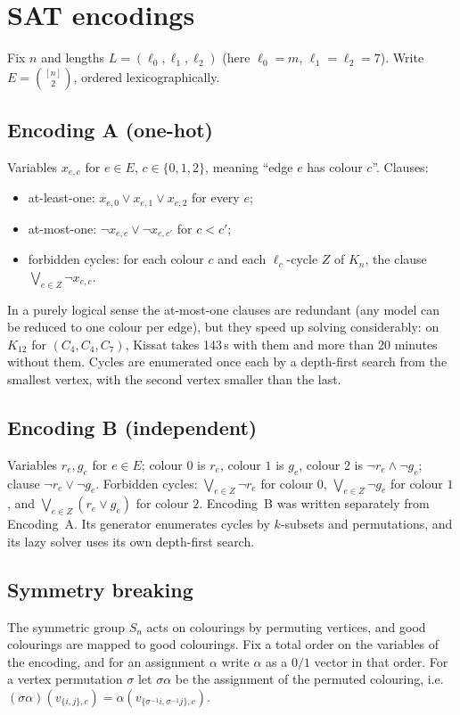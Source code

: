 \documentclass[11pt]{amsart}
\theoremstyle{definition}
\theoremstyle{remark}
\begin{document}
\section{SAT encodings}\label{sec:sat}

Fix $n$ and lengths $L=(\ell_0,\ell_1,\ell_2)$ (here $\ell_0=m$, $\ell_1=\ell_2=7$). Write $E=\binom{[n]}{2}$, ordered
lexicographically.

\subsection{Encoding A (one-hot)}
Variables $x_{e,c}$ for $e\in E$, $c\in\{0,1,2\}$, meaning ``edge $e$ has colour $c$''. Clauses:
\begin{itemize}
\item at-least-one: $x_{e,0}\vee x_{e,1}\vee x_{e,2}$ for every $e$;
\item at-most-one: $\neg x_{e,c}\vee\neg x_{e,c'}$ for $c<c'$;
\item forbidden cycles: for each colour $c$ and each $\ell_c$-cycle $Z$ of $K_n$, the clause $\bigvee_{e\in Z}\neg x_{e,c}$.
\end{itemize}
In a purely logical sense the at-most-one clauses are redundant (any model can be reduced to one colour per edge), but they speed up
solving considerably: on $K_{12}$ for $(C_4,C_4,C_7)$, Kissat takes 143\,s with them and more than 20 minutes without them. Cycles are
enumerated once each by a depth-first search from the smallest vertex, with the second vertex smaller than the last.

\subsection{Encoding B (independent)}
Variables $r_e, g_e$ for $e\in E$; colour $0$ is $r_e$, colour $1$ is $g_e$, colour $2$ is $\neg r_e\wedge\neg g_e$; clause
$\neg r_e\vee\neg g_e$. Forbidden cycles: $\bigvee_{e\in Z}\neg r_e$ for colour $0$, $\bigvee_{e\in Z}\neg g_e$ for colour $1$, and
$\bigvee_{e\in Z}(r_e\vee g_e)$ for colour $2$. Encoding~B was written separately from Encoding~A. Its generator enumerates cycles by
$k$-subsets and permutations, and its lazy solver uses its own depth-first search.

\subsection{Symmetry breaking}\label{sec:sb}
The symmetric group $S_n$ acts on colourings by permuting vertices, and good colourings are mapped to good colourings. Fix a total
order on the variables of the encoding, and for an assignment $\alpha$ write $\alpha$ as a $0/1$ vector in that order. For a vertex
permutation $\sigma$ let $\sigma\alpha$ be the assignment of the permuted colouring, i.e.\ $(\sigma\alpha)(v_{\{i,j\},c})=
\alpha(v_{\{\sigma^{-1}i,\sigma^{-1}j\},c})$.
\end{document}
